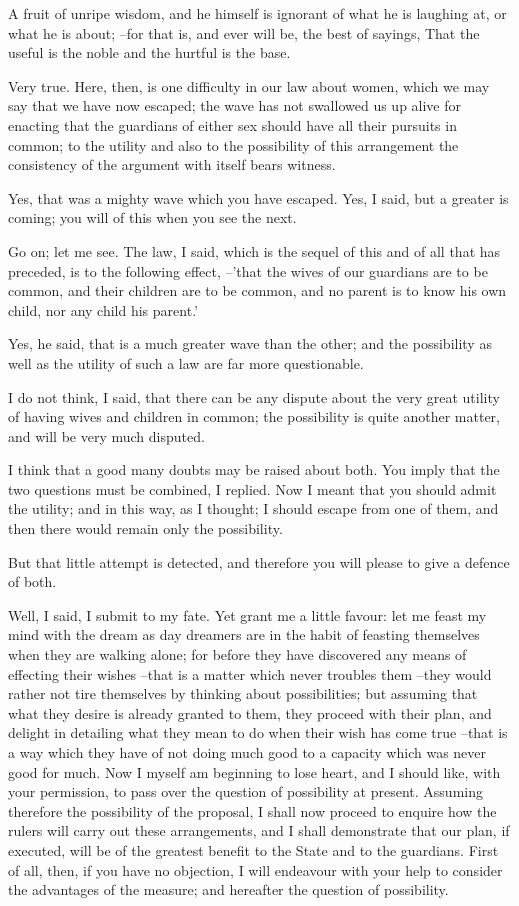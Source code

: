 A fruit of unripe wisdom, and he himself is ignorant of what he is laughing at, or what he is about; --for that is, and ever will be, the best of sayings, That the useful is the noble and the hurtful is the base.

Very true.
Here, then, is one difficulty in our law about women, which we may say that we have now escaped; the wave has not swallowed us up alive for enacting that the guardians of either sex should have all their pursuits in common; to the utility and also to the possibility of this arrangement the consistency of the argument with itself bears witness.

Yes, that was a mighty wave which you have escaped.
Yes, I said, but a greater is coming; you will of this when you see the next.

Go on; let me see.
The law, I said, which is the sequel of this and of all that has preceded, is to the following effect, --'that the wives of our guardians are to be common, and their children are to be common, and no parent is to know his own child, nor any child his parent.'

Yes, he said, that is a much greater wave than the other; and the possibility as well as the utility of such a law are far more questionable.

I do not think, I said, that there can be any dispute about the very great utility of having wives and children in common; the possibility is quite another matter, and will be very much disputed.

I think that a good many doubts may be raised about both.
You imply that the two questions must be combined, I replied. Now I meant that you should admit the utility; and in this way, as I thought; I should escape from one of them, and then there would remain only the possibility.

But that little attempt is detected, and therefore you will please to give a defence of both.

Well, I said, I submit to my fate. Yet grant me a little favour: let me feast my mind with the dream as day dreamers are in the habit of feasting themselves when they are walking alone; for before they have discovered any means of effecting their wishes --that is a matter which never troubles them --they would rather not tire themselves by thinking about possibilities; but assuming that what they desire is already granted to them, they proceed with their plan, and delight in detailing what they mean to do when their wish has come true --that is a way which they have of not doing much good to a capacity which was never good for much. Now I myself am beginning to lose heart, and I should like, with your permission, to pass over the question of possibility at present. Assuming therefore the possibility of the proposal, I shall now proceed to enquire how the rulers will carry out these arrangements, and I shall demonstrate that our plan, if executed, will be of the greatest benefit to the State and to the guardians. First of all, then, if you have no objection, I will endeavour with your help to consider the advantages of the measure; and hereafter the question of possibility.

